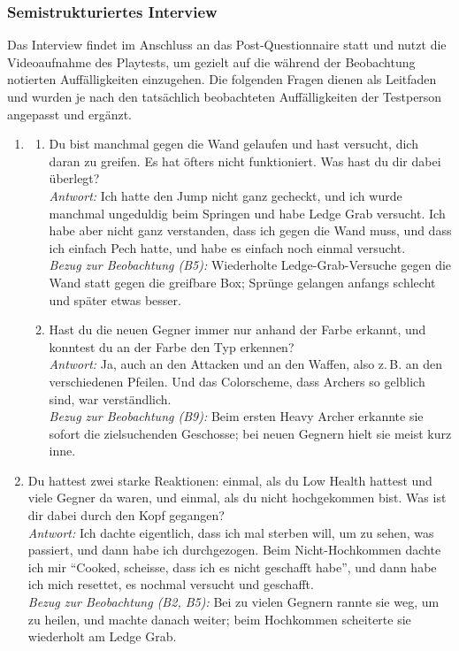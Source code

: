 \documentclass[../Main.tex]{subfiles}
\begin{document}
\subsubsection{Semistrukturiertes Interview}

Das Interview findet im Anschluss an das Post-Questionnaire statt und nutzt die Videoaufnahme des Playtests, um gezielt auf die während der Beobachtung notierten Auffälligkeiten einzugehen. Die folgenden Fragen dienen als Leitfaden und wurden je nach den tatsächlich beobachteten Auffälligkeiten der Testperson angepasst und ergänzt.

\begin{enumerate}[label=\textbf{I\arabic*}, leftmargin=1.5cm, itemsep=1em]
    \item
    \begin{enumerate}[label=\alph*), itemsep=0.6em]
        \item Du bist manchmal gegen die Wand gelaufen und hast versucht, dich daran zu greifen. Es hat öfters nicht funktioniert. Was hast du dir dabei überlegt? \\
            \textit{Antwort:} Ich hatte den Jump nicht ganz gecheckt, und ich wurde manchmal ungeduldig beim Springen und habe Ledge Grab versucht. Ich habe aber nicht ganz verstanden, dass ich gegen die Wand muss, und dass ich einfach Pech hatte, und habe es einfach noch einmal versucht. \\
            \textit{Bezug zur Beobachtung (B5):} Wiederholte Ledge-Grab-Versuche gegen die Wand statt gegen die greifbare Box; Sprünge gelangen anfangs schlecht und später etwas besser.
        \item Hast du die neuen Gegner immer nur anhand der Farbe erkannt, und konntest du an der Farbe den Typ erkennen? \\
            \textit{Antwort:} Ja, auch an den Attacken und an den Waffen, also z.\,B. an den verschiedenen Pfeilen. Und das Colorscheme, dass Archers so gelblich sind, war verständlich. \\
            \textit{Bezug zur Beobachtung (B9):} Beim ersten Heavy Archer erkannte sie sofort die zielsuchenden Geschosse; bei neuen Gegnern hielt sie meist kurz inne.
    \end{enumerate}

\item Du hattest zwei starke Reaktionen: einmal, als du Low Health hattest und viele Gegner da waren, und einmal, als du nicht hochgekommen bist. Was ist dir dabei durch den Kopf gegangen? \\
    \textit{Antwort:} Ich dachte eigentlich, dass ich mal sterben will, um zu sehen, was passiert, und dann habe ich durchgezogen. Beim Nicht-Hochkommen dachte ich mir \enquote{Cooked, scheisse, dass ich es nicht geschafft habe}, und dann habe ich mich resettet, es nochmal versucht und geschafft. \\
    \textit{Bezug zur Beobachtung (B2, B5):} Bei zu vielen Gegnern rannte sie weg, um zu heilen, und machte danach weiter; beim Hochkommen scheiterte sie wiederholt am Ledge Grab.


\end{enumerate}
\end{document}
